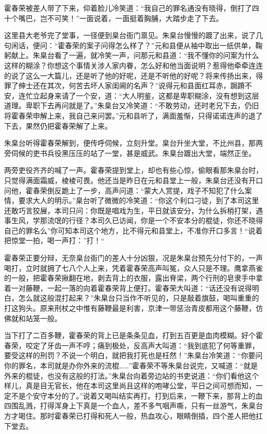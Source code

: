 \documentclass[12pt,UTF8]{ctexbook}
\begin{document}
{{{霍春荣被差人带了下来，仰着脸儿冷笑道：“我自己的罪名通没有晓得，倒打了四十个嘴巴，岂不可笑！”一面说着，一面挺着胸脯，大踏步走了下去。

这里县大老爷完了堂事，一径便到臬台衙门禀见。朱臬台慢慢的踱了出来，说了几句闲话，便问：“霍春荣的案子问得怎么样了？”元和县便从袖中取出一纸供单，鞠躬献上。朱臬台看了一遍，就冷笑一声，问那元和县道：“我不懂你的问案为什么这样的糊涂？你想这个事情关涉人家内眷，怎么好和他当面说明？惹得他牵牵连连的说了这么一大篇儿，还是听了他的好呢，还是不听他的好呢？将来传扬出来，得罪了绅士还在其次，何苦去坏人家闺阃的名声？”说得元和县面红耳赤，跼蹐不安，连忙立起身来请了一个安，道：“大人明鉴，这都是卑职糊涂，没有想到这层道理。卑职下去再问就是了。”朱臬台又冷笑道：“不敢劳动，还时老兄下去，仍旧将霍春荣申解上来，我自己来问罢。”元和县听了，满面羞惭，只得诺诺连声的退了下去，果然仍把霍春荣解了上来。

朱臬台听得霍春荣解到，便传呼伺候，立刻升堂。臬台升坐大堂，不比州县，那两旁伺候的吏书兵役黑压压的站了一堂，甚是威武。朱臬台踱出大堂，端然正坐。

两旁吏役齐齐的喊了一声。霍春荣提到堂上，却也有些心惊，偷眼看那朱臬台时，只觉得满面霜威，棱棱可畏。他还当是昨日在元和县堂上一般，朱臬台还没有开口问他，霍春荣倒反跪上了一步，高声问道：“蒙大人赏提，戏子不知犯了什么案情，要求大人的明示。”臬台听了微微的冷笑道：“你这个利口刁徒，到了本司这里还敢巧言狡展，本司只问：你既是唱戏为生，平日就该安分，为什么拆梢打架，遇事生风，学那流氓的行径？本司久已访闻，你是一个不安本分的棍徒，你还不晓得自己的罪名么”你可知本司这个地方，比不得元和县堂上，不准你开口多言！“说着把惊堂一拍，喝一声打：”打！“

霍春荣正要分辩，无奈臬台衙门的差人十分凶狠，况是朱臬台预先分付下的，一声喝打，立时就拥了七八个人上来，凭着霍春荣高声叫冤，众人只是不理。鹰拿燕雀的一般，把霍春荣揪翻在地，剥去背上的衣服，露出脊梁，两个行刑的皂隶手中拿着一对藤鞭，一起一落的向着霍春荣背上便打。霍春荣大叫道：“话还没有说得明白，怎么就这般混打起来？”朱臬台只当作不听见的，只是敲着旗鼓，喝叫重重的打这狗头。原来刑杖之中惟有藤鞭最是利害，京津一带惩治青皮都用这个藤鞭，仿佛就和站笼一般。

当下打了二百多鞭，霍春荣的背上已是条条见血，打到五百更是血肉模糊。好个霍春荣，咬定了牙齿一声不哼；痛到极处，反高声大叫道：“我到底犯了何等重罪，要受这样的刑罚？不说一个明白，就把我打死也是枉然！”朱臬台冷笑道：“你要问你的罪名，本司就是办你外来的流棍……”霍春荣不等朱臬台说完，又喊道：“就是外来的棍徒，也没有这般的打法。”朱臬台向着旁边站的书吏说道：“你们看他这个样儿，真是目无官长，他在本司这里尚且这样的咆哮公堂，平日之间可想而知，一定不是个安守本分的了。”说着又喝叫结实再打。打到后来，一鞭下来，那背上的血四围乱溅，打得浑身上下真是一个血人，差不多气咽声嘶，只有一丝游气，朱臬台方才喝住。那时霍春荣已打得和死人一般，热血攻心，眼睛倒插，四个差人把他扛下堂去。

}}}
\end{document}

